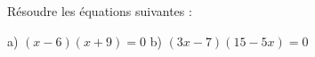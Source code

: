 \begin{minipage}{0.99\linewidth}

\exo


Résoudre les équations suivantes :

\begin{center}
a) $(x-6)(x+9)=0$ \quad \quad \quad b) $(3x-7)(15-5x)=0$
\end{center}

\end{minipage}

\vspace{0.5cm}
